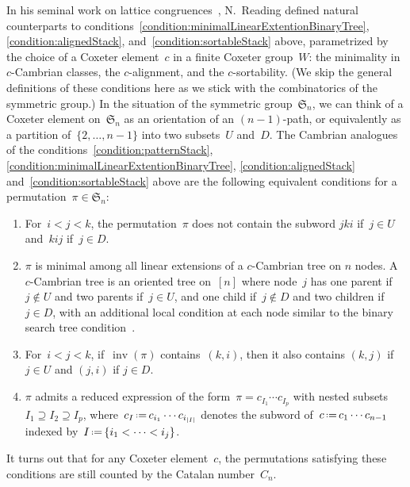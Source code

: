 \documentclass{amsart}
\newcommand{\fS}{\mathfrak{S}} %
\newcommand{\eqdef}{\mbox{\,\raisebox{0.2ex}{\scriptsize\ensuremath{\mathrm:}}\ensuremath{=}\,}} %
\DeclareMathOperator{\inv}{inv} %
\begin{document}
In his seminal work on lattice congruences~\cite{Reading-latticeCongruences, Reading-CambrianLattices, Reading-CoxeterSortable}, N.~Reading defined natural counterparts to conditions~\eqref{condition:minimalLinearExtentionBinaryTree}, \eqref{condition:alignedStack}, and~\eqref{condition:sortableStack} above, parametrized by the choice of a Coxeter element~$c$ in a finite Coxeter group~$W$: the minimality in $c$-Cambrian classes, the $c$-alignment, and the $c$-sortability.
(We skip the general definitions of these conditions here as we stick with the combinatorics of the symmetric group.)
%
In the situation of the symmetric group~$\fS_n$, we can think of a Coxeter element on~$\fS_n$ as an orientation of an $(n-1)$-path, or equivalently as a partition of~$\{2, \dots, n-1\}$ into two subsets~$U$ and~$D$.
The Cambrian analogues of the conditions~\eqref{condition:patternStack}, \eqref{condition:minimalLinearExtentionBinaryTree}, \eqref{condition:alignedStack} and~\eqref{condition:sortableStack} above are the following equivalent conditions for a permutation~$\pi \in \fS_n$:
\begin{enumerate}[(i')]
\addtocounter{enumi}{1}
%
\item \label{condition:patternCambrian}
For~$i < j < k$, the permutation~$\pi$ does not contain the subword $jki$ if~$j \in U$ and~$kij$ if~$j \in D$.
%
\item \label{condition:minimalLinearExtentionCambrian}
$\pi$ is minimal among all linear extensions of a $c$-Cambrian tree on $n$ nodes. A $c$-Cambrian tree is an oriented tree on~$[n]$ where node~$j$ has one parent if~$j \notin U$ and two parents if~$j \in U$, and one child if~$j \notin D$ and two children if~$j \in D$, with an additional local condition at each node similar to the binary search tree condition~\cite{ChatelPilaud}.
%
\item \label{condition:alignedCambrian}
For~$i < j < k$, if~$\inv(\pi)$ contains~$(k,i)$, then it also contains $(k,j)$ if~$j \in U$ and $(j,i)$ if $j \in D$.
%
\item \label{condition:sortableCambrian}
$\pi$ admits a reduced expression of the form~$\pi = c_{I_1} \cdots c_{I_p}$ with nested subsets~$I_1 \supseteq I_2 \supseteq I_p$, where~$c_I \eqdef c_{i_1} \cdots c_{i_{|I|}}$ denotes the subword of~$c \eqdef c_1 \cdots c_{n-1}$ indexed by~$I \eqdef \{i_1 < \dots < i_j\}$.
\end{enumerate}
It turns out that for any Coxeter element~$c$, the permutations satisfying these conditions are still counted by the Catalan number~$C_n$.
\end{document}
